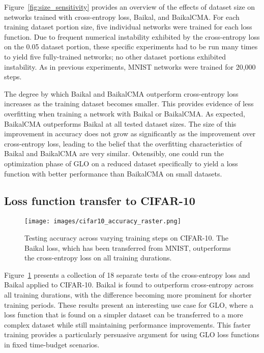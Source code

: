 \documentclass[conference]{IEEEtran}
\begin{document}
Figure~\ref{fig:size_sensitivity} provides an overview of the effects of dataset size on networks trained with cross-entropy loss, Baikal, and BaikalCMA. For each training dataset portion size, five individual networks were trained for each loss function. Due to frequent numerical instability exhibited by the cross-entropy loss on the 0.05 dataset portion, these specific experiments had to be run many times to yield five fully-trained networks; no other dataset portions exhibited instability. As in previous experiments, MNIST networks were trained for 20,000 steps.


The degree by which Baikal and BaikalCMA outperform cross-entropy loss increases as the training dataset becomes smaller. This provides evidence of less overfitting when training a network with Baikal or BaikalCMA. As expected, BaikalCMA outperforms Baikal at all tested dataset sizes. The size of this improvement in accuracy does not grow as significantly as the improvement over cross-entropy loss, leading to the belief that the overfitting characteristics of Baikal and BaikalCMA are very similar. Ostensibly, one could run the optimization phase of GLO on a reduced dataset specifically to yield a loss function with better performance than BaikalCMA on small datasets.

\subsection{Loss function transfer to CIFAR-10}

\begin{figure}
  \centering
\texttt{[image: images/cifar10\_accuracy\_raster.png]}
  \caption{Testing accuracy across varying training steps on CIFAR-10. The Baikal loss, which has been transferred from MNIST, outperforms the cross-entropy loss on all training durations.}
  \label{fig:transfer}
\end{figure}

Figure~\ref{fig:transfer} presents a collection of 18 separate tests of the cross-entropy loss and Baikal applied to CIFAR-10. Baikal is found to outperform cross-entropy across all training durations, with the difference becoming more prominent for shorter training periods. These results present an interesting use case for GLO, where a loss function that is found on a simpler dataset can be transferred to a more complex dataset while still maintaining performance improvements. This faster training provides a particularly persuasive argument for using GLO loss functions in fixed time-budget scenarios.
\end{document}
